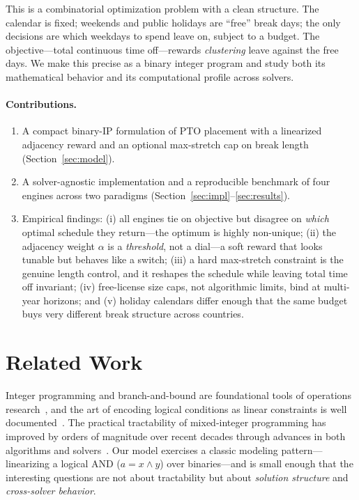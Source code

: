 \documentclass[10pt,twocolumn]{article}
\begin{document}
This is a combinatorial optimization problem with a clean structure. The
calendar is fixed; weekends and public holidays are ``free'' break days; the
only decisions are which weekdays to spend leave on, subject to a budget. The
objective---total continuous time off---rewards \emph{clustering} leave against
the free days. We make this precise as a binary integer program and study both
its mathematical behavior and its computational profile across solvers.

\paragraph{Contributions.}
\begin{enumerate}[leftmargin=1.4em,itemsep=2pt,topsep=2pt]
  \item A compact binary-IP formulation of PTO placement with a linearized
        adjacency reward and an optional max-stretch cap on break length
        (Section~\ref{sec:model}).
  \item A solver-agnostic implementation and a reproducible benchmark of four
        engines across two paradigms (Section~\ref{sec:impl}--\ref{sec:results}).
  \item Empirical findings: (i) all engines tie on objective but disagree on
        \emph{which} optimal schedule they return---the optimum is highly
        non-unique; (ii) the adjacency weight $\alpha$ is a \emph{threshold},
        not a dial---a soft reward that looks tunable but behaves like a switch;
        (iii) a hard max-stretch constraint is the genuine length control, and
        it reshapes the schedule while leaving total time off invariant;
        (iv) free-license size caps, not algorithmic limits, bind at multi-year
        horizons; and (v) holiday calendars differ enough that the same budget
        buys very different break structure across countries.
\end{enumerate}

\section{Related Work}

Integer programming and branch-and-bound are foundational tools of operations
research~\cite{land1960automatic,wolsey1999integer}, and the art of encoding
logical conditions as linear constraints is well
documented~\cite{williams2013model}. The practical tractability of
mixed-integer programming has improved by orders of magnitude over recent
decades through advances in both algorithms and
solvers~\cite{bixby2012brief,achterberg2013mixed}. Our model exercises a
classic modeling pattern---linearizing a logical AND ($a = x \wedge y$) over
binaries---and is small enough that the interesting questions are not about
tractability but about \emph{solution structure} and \emph{cross-solver
behavior}.
\end{document}

